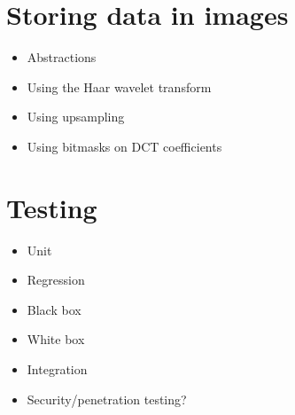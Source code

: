 \section{Storing data in images}
    \begin{itemize}
        \item Abstractions
        \item Using the Haar wavelet transform
        \item Using upsampling
        \item Using bitmasks on DCT coefficients
    \end{itemize}

\section{Testing}
    \begin{itemize}
        \item Unit
        \item Regression
        \item Black box
        \item White box
        \item Integration
        \item Security/penetration testing?
    \end{itemize}

